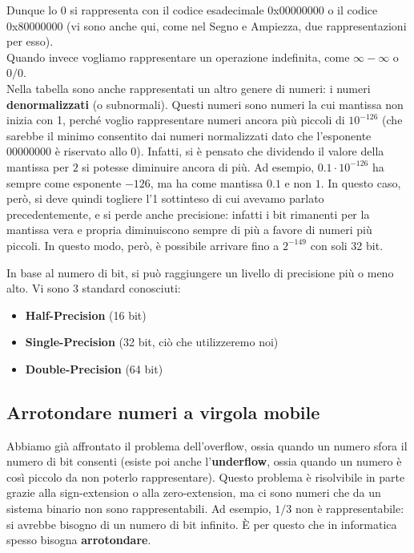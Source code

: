 \documentclass[11pt, a4paper, titlepage, oneside]{scrbook}
\begin{document}
Dunque lo 0 si rappresenta con il codice esadecimale 0x00000000 o il codice 0x80000000 (vi sono anche qui, come nel Segno e Ampiezza, due rappresentazioni per esso). \\
Quando invece vogliamo rappresentare un operazione indefinita, come $\infty - \infty$ o $0/0$. \\
Nella tabella sono anche rappresentati un altro genere di numeri: i numeri \textbf{denormalizzati} (o subnormali). Questi numeri sono numeri la cui mantissa non inizia con 1, perché voglio rappresentare numeri ancora più piccoli di $10^{-126}$ (che sarebbe il minimo consentito dai numeri normalizzati dato che l'esponente 00000000 è riservato allo 0). Infatti, si è pensato che dividendo il valore della mantissa per $2$ si potesse diminuire ancora di più. Ad esempio, $0.1 \cdot 10^{-126}$ ha sempre come esponente $-126$, ma ha come mantissa $0.1$ e non $1$. In questo caso, però, si deve quindi togliere l'1 sottinteso di cui avevamo parlato precedentemente, e si perde anche precisione: infatti i bit rimanenti per la mantissa vera e propria diminuiscono sempre di più a favore di numeri più piccoli. In questo modo, però, è possibile arrivare fino a $2^{-149}$ con soli 32 bit.

\begin{Proprieta}
\label{prop-livello-di-precisione}
In base al numero di bit, si può raggiungere un livello di precisione più o meno alto. Vi sono 3 standard conosciuti:
\begin{itemize}
    \item \textbf{Half-Precision} (16 bit)
    \item \textbf{Single-Precision} (32 bit, ciò che utilizzeremo noi)
    \item \textbf{Double-Precision} (64 bit)
\end{itemize}
\end{Proprieta}

\subsection{Arrotondare numeri a virgola mobile}

Abbiamo già affrontato il problema dell'overflow, ossia quando un numero sfora il numero di bit consenti (esiste poi anche l'\textbf{underflow}, ossia quando un numero è così piccolo da non poterlo rappresentare). Questo problema è risolvibile in parte grazie alla sign-extension o alla zero-extension, ma ci sono numeri che da un sistema binario non sono rappresentabili. Ad esempio, $1/3$ non è rappresentabile: si avrebbe bisogno di un numero di bit infinito. È per questo che in informatica spesso bisogna \textbf{arrotondare}.
\end{document}
